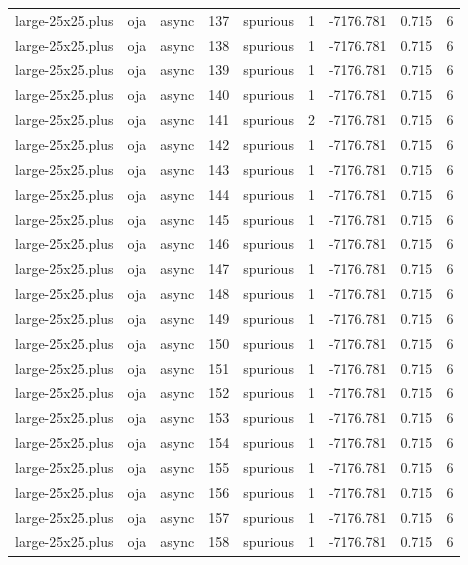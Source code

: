 \begin{tabular}{lllrlrrrr}
large-25x25.plus & oja & async & 137 & spurious & 1 & -7176.781 & 0.715 & 6 \\
large-25x25.plus & oja & async & 138 & spurious & 1 & -7176.781 & 0.715 & 6 \\
large-25x25.plus & oja & async & 139 & spurious & 1 & -7176.781 & 0.715 & 6 \\
large-25x25.plus & oja & async & 140 & spurious & 1 & -7176.781 & 0.715 & 6 \\
large-25x25.plus & oja & async & 141 & spurious & 2 & -7176.781 & 0.715 & 6 \\
large-25x25.plus & oja & async & 142 & spurious & 1 & -7176.781 & 0.715 & 6 \\
large-25x25.plus & oja & async & 143 & spurious & 1 & -7176.781 & 0.715 & 6 \\
large-25x25.plus & oja & async & 144 & spurious & 1 & -7176.781 & 0.715 & 6 \\
large-25x25.plus & oja & async & 145 & spurious & 1 & -7176.781 & 0.715 & 6 \\
large-25x25.plus & oja & async & 146 & spurious & 1 & -7176.781 & 0.715 & 6 \\
large-25x25.plus & oja & async & 147 & spurious & 1 & -7176.781 & 0.715 & 6 \\
large-25x25.plus & oja & async & 148 & spurious & 1 & -7176.781 & 0.715 & 6 \\
large-25x25.plus & oja & async & 149 & spurious & 1 & -7176.781 & 0.715 & 6 \\
large-25x25.plus & oja & async & 150 & spurious & 1 & -7176.781 & 0.715 & 6 \\
large-25x25.plus & oja & async & 151 & spurious & 1 & -7176.781 & 0.715 & 6 \\
large-25x25.plus & oja & async & 152 & spurious & 1 & -7176.781 & 0.715 & 6 \\
large-25x25.plus & oja & async & 153 & spurious & 1 & -7176.781 & 0.715 & 6 \\
large-25x25.plus & oja & async & 154 & spurious & 1 & -7176.781 & 0.715 & 6 \\
large-25x25.plus & oja & async & 155 & spurious & 1 & -7176.781 & 0.715 & 6 \\
large-25x25.plus & oja & async & 156 & spurious & 1 & -7176.781 & 0.715 & 6 \\
large-25x25.plus & oja & async & 157 & spurious & 1 & -7176.781 & 0.715 & 6 \\
large-25x25.plus & oja & async & 158 & spurious & 1 & -7176.781 & 0.715 & 6 \\

\end{tabular}

